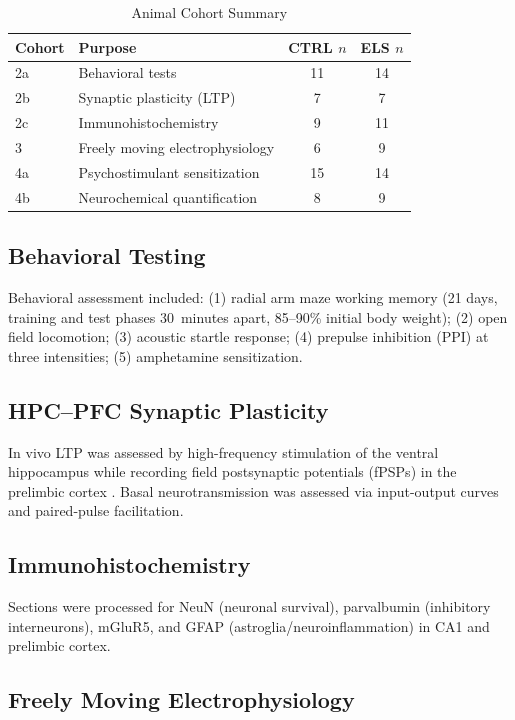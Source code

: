 \documentclass[11pt]{article}
\begin{document}
\begin{table}[ht]
\centering
\caption{Animal Cohort Summary}
\label{tab:cohorts}
\begin{tabular}{llcc}
\toprule
\textbf{Cohort} & \textbf{Purpose} & \textbf{CTRL $n$} & \textbf{ELS $n$} \\
\midrule
2a & Behavioral tests & 11 & 14 \\
2b & Synaptic plasticity (LTP) & 7 & 7 \\
2c & Immunohistochemistry & 9 & 11 \\
3 & Freely moving electrophysiology & 6 & 9 \\
4a & Psychostimulant sensitization & 15 & 14 \\
4b & Neurochemical quantification & 8 & 9 \\
\bottomrule
\end{tabular}
\end{table}

\subsection{Behavioral Testing}

Behavioral assessment included: (1) radial arm maze working memory (21 days, training and test phases 30~minutes apart, 85--90\% initial body weight); (2) open field locomotion; (3) acoustic startle response; (4) prepulse inhibition (PPI) at three intensities; (5) amphetamine sensitization.

\subsection{HPC--PFC Synaptic Plasticity}

In vivo LTP was assessed by high-frequency stimulation of the ventral hippocampus while recording field postsynaptic potentials (fPSPs) in the prelimbic cortex \citep{thierry2000hippocampo, bliss1993synaptic}. Basal neurotransmission was assessed via input-output curves and paired-pulse facilitation.

\subsection{Immunohistochemistry}

Sections were processed for NeuN (neuronal survival), parvalbumin (inhibitory interneurons), mGluR5, and GFAP (astroglia/neuroinflammation) in CA1 and prelimbic cortex.

\subsection{Freely Moving Electrophysiology}
\end{document}
